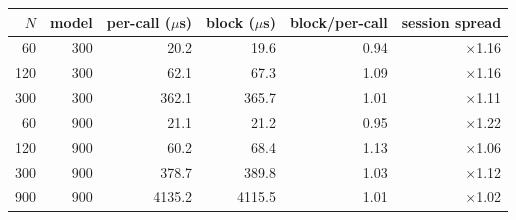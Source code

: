 \begin{tabular}{@{}r r r r r r@{}}
\toprule
$N$ & model & per-call ($\mu$s) & block ($\mu$s) & block/per-call & session spread \\
\midrule
60 & 300 & 20.2 & 19.6 & 0.94 & $\times$1.16 \\
120 & 300 & 62.1 & 67.3 & 1.09 & $\times$1.16 \\
300 & 300 & 362.1 & 365.7 & 1.01 & $\times$1.11 \\
60 & 900 & 21.1 & 21.2 & 0.95 & $\times$1.22 \\
120 & 900 & 60.2 & 68.4 & 1.13 & $\times$1.06 \\
300 & 900 & 378.7 & 389.8 & 1.03 & $\times$1.12 \\
900 & 900 & 4135.2 & 4115.5 & 1.01 & $\times$1.02 \\
\bottomrule
\end{tabular}
